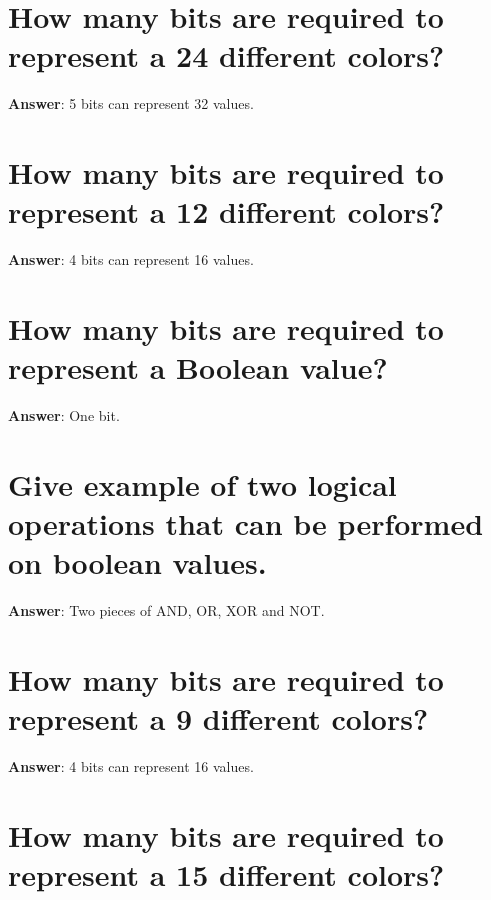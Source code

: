\documentclass[a4paper,11pt,oneside]{book}
\begin{document}
\begin{sloppypar}
\section{How many bits are required to represent a 24 different colors?}

\label{q:85:sa:en:True}

\textbf{Answer}: 5 bits can represent 32 values.



\section{How many bits are required to represent a 12 different colors?}

\label{q:86:sa:en:True}

\textbf{Answer}: 4 bits can represent 16 values.



\section{How many bits are required to represent a Boolean value?}

\label{q:87:sa:en:True}

\textbf{Answer}: One bit.



\section{Give example of two logical operations that can be performed on boolean values.}

\label{q:88:sa:en:True}

\textbf{Answer}: Two pieces of AND, OR, XOR and NOT.



\section{How many bits are required to represent a 9 different colors?}

\label{q:89:sa:en:True}

\textbf{Answer}: 4 bits can represent 16 values.



\section{How many bits are required to represent a 15 different colors?}


\end{sloppypar}
\end{document}
